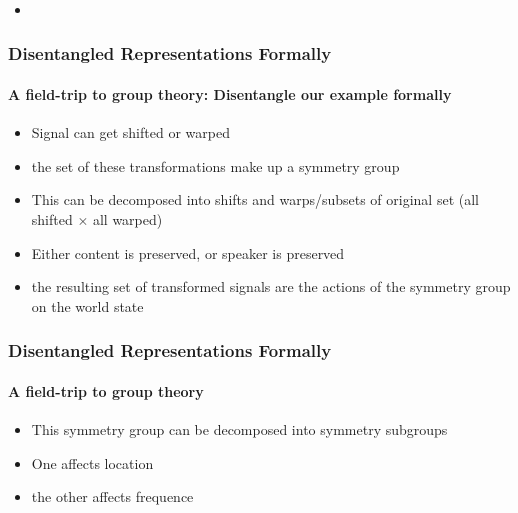 \documentclass[9pt]{beamer}
\begin{document}
\begin{frame}
\frametitle{}
\framesubtitle{}
\begin{itemize}
	\item 
\end{itemize}
\end{frame} 


\begin{frame}
\frametitle{Disentangled Representations Formally}
\framesubtitle{A field-trip to group theory: Disentangle our example formally}
\begin{itemize}%
	\item Signal can get shifted or warped
	\item the set of these transformations make up a symmetry group
	\item This can be decomposed into shifts and warps/subsets of original set (all shifted $\times$ all warped)
	\item Either content is preserved, or speaker is preserved
	\item the resulting set of transformed signals are the actions of the symmetry group on the world state
\end{itemize}
\end{frame} 




\begin{frame}
\frametitle{Disentangled Representations Formally}
\framesubtitle{A field-trip to group theory}
\begin{itemize}%
	\item This symmetry group can be decomposed into symmetry subgroups
	\item One affects location
	\item the other affects frequence
\end{itemize}
\end{frame} 
\end{document}
